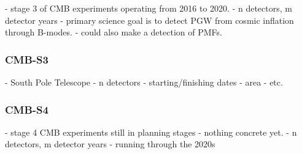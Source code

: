 	- stage 3 of CMB experiments operating from 2016 to 2020.
	- n detectors, m detector years
	- primary science goal is to detect PGW from cosmic inflation through B-modes.
	- could also make a detection of PMFs.
\subsubsection{CMB-S3}
	
	
	- South Pole Telescope
	- n detectors
	- starting/finishing dates
	- area
	- etc.

\subsubsection{CMB-S4}
	- stage 4 CMB experiments still in planning stages - nothing concrete yet.
	- n detectors, m detector years
	- running through the 2020s